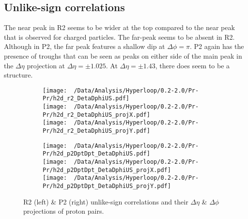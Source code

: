 \documentclass[12pt,a4paper,twoside]{report}
\begin{document}
\subsection{Unlike-sign correlations}
The near peak in R2 seems to be wider at the top compared to the near peak that is observed for charged particles. The far-peak seems to be absent in R2. Although in P2, the far peak features a shallow dip at $\Delta\phi=\pi$.
P2 again has the presence of troughs that can be seen as peaks on either side of the main peak in the $\Delta\eta$ projection at $\Delta\eta=\pm1.025$. At $\Delta\eta=\pm1.43$, there does seem to be a structure.
\begin{figure}[H]
	\begin{subfigure}{0.49\linewidth}
		\texttt{[image: ~/Data/Analysis/Hyperloop/0.2-2.0/Pr-Pr/h2d\_r2\_DetaDphiUS.pdf]}\\
		\texttt{[image: ~/Data/Analysis/Hyperloop/0.2-2.0/Pr-Pr/h2d\_r2\_DetaDphiUS\_projX.pdf]}\\
		\texttt{[image: ~/Data/Analysis/Hyperloop/0.2-2.0/Pr-Pr/h2d\_r2\_DetaDphiUS\_projY.pdf]}\\
	\end{subfigure}
	\begin{subfigure}{0.49\linewidth}
		\texttt{[image: ~/Data/Analysis/Hyperloop/0.2-2.0/Pr-Pr/h2d\_p2DptDpt\_DetaDphiUS.pdf]}\\
		\texttt{[image: ~/Data/Analysis/Hyperloop/0.2-2.0/Pr-Pr/h2d\_p2DptDpt\_DetaDphiUS\_projX.pdf]}\\
		\texttt{[image: ~/Data/Analysis/Hyperloop/0.2-2.0/Pr-Pr/h2d\_p2DptDpt\_DetaDphiUS\_projY.pdf]}\\
	\end{subfigure}
	\caption{R2 (left) \& P2 (right) unlike-sign correlations and their $\Delta\eta$ \& $\Delta\phi$ projections of proton pairs.}
\end{figure}
\end{document}
